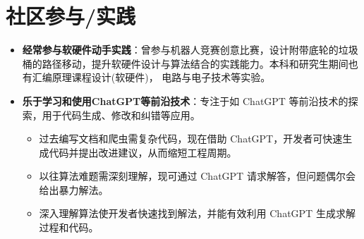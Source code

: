 \documentclass{resume}
\begin{document}
\section{社区参与/实践}
\begin{itemize}[parsep=0.2ex]  
  \item \textbf{经常参与软硬件动手实践}：曾参与机器人竞赛创意比赛，设计附带底轮的垃圾桶的路径移动，提升软硬件设计与算法结合的实践能力。本科和研究生期间也有汇编原理课程设计(软硬件)， 电路与电子技术等实验。
  \item \textbf{乐于学习和使用ChatGPT等前沿技术}：专注于如 ChatGPT 等前沿技术的探索，用于代码生成、修改和纠错等应用。
  \begin{itemize}
	\item 过去编写文档和爬虫需复杂代码，现在借助 ChatGPT，开发者可快速生成代码并提出改进建议，从而缩短工程周期。
	
	\item 以往算法难题需深刻理解，现可通过 ChatGPT 请求解答，但问题偶尔会给出暴力解法。
	
	\item 深入理解算法使开发者快速找到解法，并能有效利用 ChatGPT 生成求解过程和代码。
  \end{itemize}
  
\end{itemize}

%
%
\end{document}
